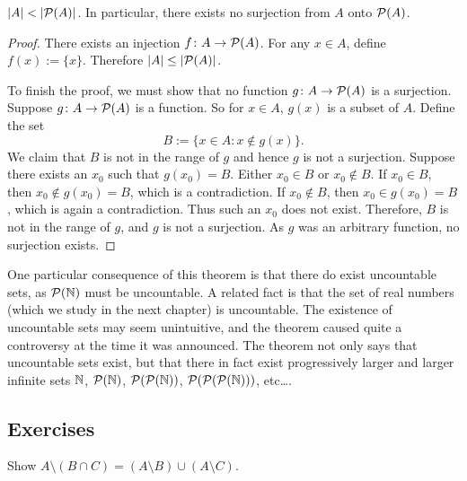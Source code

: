 \begin{thm}
\label{cantorspowersetthm}
$\left\lvert {A} \right\rvert < \left\lvert {{\mathcal{P}}(A)} \right\rvert$.  In particular, there exists no surjection from
$A$ onto ${\mathcal{P}}(A)$.
\end{thm}

\begin{proof}
There exists an injection $f \colon A \to {\mathcal{P}}(A)$.
For any $x \in A$, define $f(x) := \{ x \}$.  Therefore
$\left\lvert {A} \right\rvert \leq \left\lvert {{\mathcal{P}}(A)} \right\rvert$.

To finish the proof, we must show that
no function $g \colon A \to {\mathcal{P}}(A)$ is a surjection.
Suppose 
$g \colon A \to {\mathcal{P}}(A)$ is a function.  So for $x \in A$,
$g(x)$ is a subset of $A$.  Define the set
\begin{equation*}
B := \{ x \in A : x \notin g(x) \} .
\end{equation*}
We claim that $B$ is not in the range of $g$ and hence $g$ is not a
surjection.  Suppose there exists an $x_0$ such that $g(x_0) = B$.
Either $x_0 \in B$ or $x_0 \notin B$.  If $x_0 \in B$, then $x_0 \notin
g(x_0) = B$, which is a contradiction.  If $x_0 \notin B$, then $x_0 \in
g(x_0) = B$, which is again a contradiction.  Thus such an $x_0$ does not
exist.  Therefore, $B$ is not in the range of $g$, and $g$ is not a
surjection.  As $g$ was an arbitrary function, no surjection exists.
\end{proof}

One particular consequence of this 
theorem is that there do exist uncountable sets,
as ${\mathcal{P}}({\mathbb{N}})$ must be uncountable.
A related fact is that
the set of real numbers (which we study in the next chapter) is uncountable.
The existence of uncountable sets may seem unintuitive, and the theorem
caused quite a controversy at the time
it was announced.  The theorem not only says that uncountable sets exist,
but that there in fact exist progressively larger
and larger infinite sets ${\mathbb{N}}$, ${\mathcal{P}}({\mathbb{N}})$,
${\mathcal{P}}({\mathcal{P}}({\mathbb{N}}))$, ${\mathcal{P}}({\mathcal{P}}({\mathcal{P}}({\mathbb{N}})))$, etc\ldots.

\subsection{Exercises}

\begin{exercise}
Show
$A \setminus (B \cap C) = (A \setminus B) \cup (A \setminus C)$.
\end{exercise}

